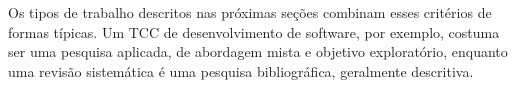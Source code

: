 Os tipos de trabalho descritos nas próximas seções combinam esses critérios de formas típicas. Um TCC de desenvolvimento de software, por exemplo, costuma ser uma pesquisa aplicada, de abordagem mista e objetivo exploratório, enquanto uma revisão sistemática é uma pesquisa bibliográfica, geralmente descritiva.
